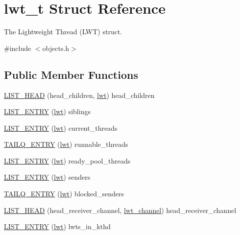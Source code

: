 \hypertarget{structlwt}{\section{lwt\+\_\+t Struct Reference}
\label{structlwt}
}


The Lightweight Thread (L\+W\+T) struct.  




{\ttfamily \#include $<$objects.\+h$>$}

\subsection*{Public Member Functions}
\begin{DoxyCompactItemize}
\item 
\hyperlink{structlwt_af9285d2b35542f46f5a678caf22421e1}{L\+I\+S\+T\+\_\+\+H\+E\+A\+D} (head\+\_\+children, \hyperlink{structlwt}{lwt}) head\+\_\+children
\item 
\hyperlink{structlwt_a9a70db55b41f29b93fbe13e2c6062985}{L\+I\+S\+T\+\_\+\+E\+N\+T\+R\+Y} (\hyperlink{structlwt}{lwt}) siblings
\item 
\hyperlink{structlwt_ab0af0978d5311b677217897de4b078c9}{L\+I\+S\+T\+\_\+\+E\+N\+T\+R\+Y} (\hyperlink{structlwt}{lwt}) current\+\_\+threads
\item 
\hyperlink{structlwt_a057a287ecebd5d4d47d6fa6896f442e8}{T\+A\+I\+L\+Q\+\_\+\+E\+N\+T\+R\+Y} (\hyperlink{structlwt}{lwt}) runnable\+\_\+threads
\item 
\hyperlink{structlwt_a5103ea93b32a8a2f7519e923272e8561}{L\+I\+S\+T\+\_\+\+E\+N\+T\+R\+Y} (\hyperlink{structlwt}{lwt}) ready\+\_\+pool\+\_\+threads
\item 
\hyperlink{structlwt_a24dcc6f4e7b9d2b156c822e6a1897582}{L\+I\+S\+T\+\_\+\+E\+N\+T\+R\+Y} (\hyperlink{structlwt}{lwt}) senders
\item 
\hyperlink{structlwt_a59e427b0edc9bd7084541197a6f5d9e5}{T\+A\+I\+L\+Q\+\_\+\+E\+N\+T\+R\+Y} (\hyperlink{structlwt}{lwt}) blocked\+\_\+senders
\item 
\hyperlink{structlwt_ad7f3520d6bdb056f5ac28e86d4ec68d9}{L\+I\+S\+T\+\_\+\+H\+E\+A\+D} (head\+\_\+receiver\+\_\+channel, \hyperlink{structlwt__channel}{lwt\+\_\+channel}) head\+\_\+receiver\+\_\+channel
\item 
\hyperlink{structlwt_a4673d51a6c4ace17a259bf1173b22b01}{L\+I\+S\+T\+\_\+\+E\+N\+T\+R\+Y} (\hyperlink{structlwt}{lwt}) lwts\+\_\+in\+\_\+kthd
\end{DoxyCompactItemize}

